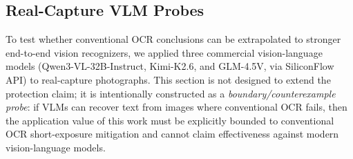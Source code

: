 \documentclass{ieeeaccess}
\begin{document}
\subsection{Real-Capture VLM Probes}
\label{sec:vlm}

To test whether conventional OCR conclusions can be extrapolated to stronger end-to-end vision recognizers, we applied three commercial vision-language models (Qwen3-VL-32B-Instruct, Kimi-K2.6, and GLM-4.5V, via SiliconFlow API) to real-capture photographs. This section is not designed to extend the protection claim; it is intentionally constructed as a \emph{boundary/counterexample probe}: if VLMs can recover text from images where conventional OCR fails, then the application value of this work must be explicitly bounded to conventional OCR short-exposure mitigation and cannot claim effectiveness against modern vision-language models.
\end{document}
